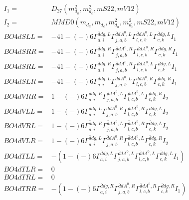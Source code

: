 \documentclass[A4,landscape]{article}
\begin{document}
\begin{align} 
I_1 = & D_{27}(m^2_{d_{{a}}}, m^2_{d_{{c}}}, mS22, mV12) \\ 
I_2 = & MMD0(m_{d_{{a}}}, m_{d_{{c}}}, m^2_{d_{{a}}}, m^2_{d_{{c}}}, mS22, mV12) \\ 
  BO4dSLL= & -4   1
-(-)
  6 \Gamma^{\bar{d}d g ,L}_{a, i} \Gamma^{\bar{d}d A^0 ,L}_{j, a, b} \Gamma^{\bar{d}d A^0 ,L}_{l, c, b} \Gamma^{\bar{d}d g ,L}_{c, k} I_1 \\ 
  BO4dSRR= & -4   1
-(-)
  6 \Gamma^{\bar{d}d g ,R}_{a, i} \Gamma^{\bar{d}d A^0 ,R}_{j, a, b} \Gamma^{\bar{d}d A^0 ,R}_{l, c, b} \Gamma^{\bar{d}d g ,R}_{c, k} I_1 \\ 
  BO4dSRL= & -4   1
-(-)
  6 \Gamma^{\bar{d}d g ,R}_{a, i} \Gamma^{\bar{d}d A^0 ,R}_{j, a, b} \Gamma^{\bar{d}d A^0 ,L}_{l, c, b} \Gamma^{\bar{d}d g ,L}_{c, k} I_1 \\ 
  BO4dSLR= & -4   1
-(-)
  6 \Gamma^{\bar{d}d g ,L}_{a, i} \Gamma^{\bar{d}d A^0 ,L}_{j, a, b} \Gamma^{\bar{d}d A^0 ,R}_{l, c, b} \Gamma^{\bar{d}d g ,R}_{c, k} I_1 \\ 
  BO4dVRR= &   1
-(-)
  6 \Gamma^{\bar{d}d g ,R}_{a, i} \Gamma^{\bar{d}d A^0 ,L}_{j, a, b} \Gamma^{\bar{d}d A^0 ,L}_{l, c, b} \Gamma^{\bar{d}d g ,R}_{c, k} I_2 \\ 
  BO4dVLL= &   1
-(-)
  6 \Gamma^{\bar{d}d g ,L}_{a, i} \Gamma^{\bar{d}d A^0 ,R}_{j, a, b} \Gamma^{\bar{d}d A^0 ,R}_{l, c, b} \Gamma^{\bar{d}d g ,L}_{c, k} I_2 \\ 
  BO4dVRL= &   1
-(-)
  6 \Gamma^{\bar{d}d g ,R}_{a, i} \Gamma^{\bar{d}d A^0 ,L}_{j, a, b} \Gamma^{\bar{d}d A^0 ,R}_{l, c, b} \Gamma^{\bar{d}d g ,L}_{c, k} I_2 \\ 
  BO4dVLR= &   1
-(-)
  6 \Gamma^{\bar{d}d g ,L}_{a, i} \Gamma^{\bar{d}d A^0 ,R}_{j, a, b} \Gamma^{\bar{d}d A^0 ,L}_{l, c, b} \Gamma^{\bar{d}d g ,R}_{c, k} I_2 \\ 
  BO4dTLL= & -(  1
-(-)
  6 \Gamma^{\bar{d}d g ,L}_{a, i} \Gamma^{\bar{d}d A^0 ,L}_{j, a, b} \Gamma^{\bar{d}d A^0 ,L}_{l, c, b} \Gamma^{\bar{d}d g ,L}_{c, k} I_1) \\ 
  BO4dTLR= & 0 \\ 
  BO4dTRL= & 0 \\ 
  BO4dTRR= & -(  1
-(-)
  6 \Gamma^{\bar{d}d g ,R}_{a, i} \Gamma^{\bar{d}d A^0 ,R}_{j, a, b} \Gamma^{\bar{d}d A^0 ,R}_{l, c, b} \Gamma^{\bar{d}d g ,R}_{c, k} I_1) \\ 
\end{align} 
\end{document}
